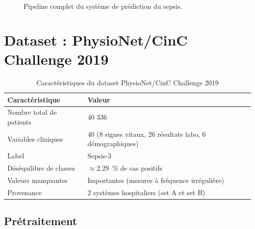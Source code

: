 \documentclass[11pt,a4paper]{article}
\begin{document}
\begin{figure}[H]
\caption{Pipeline complet du système de prédiction du sepsis.}
\label{fig:pipeline}
\end{figure}


\section{Dataset : PhysioNet/CinC Challenge 2019}

\begin{table}[H]
\centering
\caption{Caractéristiques du dataset PhysioNet/CinC Challenge 2019 \cite{physionet2019}}
\begin{tabular}{ll}
\toprule
\textbf{Caractéristique} & \textbf{Valeur} \\
\midrule
Nombre total de patients & 40 336 \\
Variables cliniques & 40 (8 signes vitaux, 26 résultats labo, 6 démographiques) \\
Label & Sepsis-3 \\
Déséquilibre de classes & $\approx 2.29$~\% de cas positifs \\
Valeurs manquantes & Importantes (mesures à fréquence irrégulière) \\
Provenance & 2 systèmes hospitaliers (set A et set B) \\
\bottomrule
\end{tabular}
\end{table}

\subsection{Prétraitement}
\end{document}
